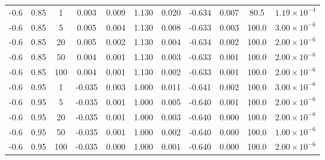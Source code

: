 \documentclass[10pt,twoside]{article}
\numberwithin{equation}{section}
\begin{document}
\begin{table}[htbp]
\begin{center}
\begin{tabular}{|c|c|c|cc|cc|cc|c|c|}
-0.6 & 0.85 & 1 & 0.003 & 0.009 & 1.130 & 0.020 & -0.634 & 0.007 & 80.5 & $1.19\times10^{-4}$ \\

-0.6 & 0.85 & 5 & 0.005 & 0.004 & 1.130 & 0.008 & -0.633 & 0.003 & 100.0 & $3.00\times10^{-6}$ \\

-0.6 & 0.85 & 20 & 0.005 & 0.002 & 1.130 & 0.004 & -0.634 & 0.002 & 100.0 & $2.00\times10^{-6}$ \\

-0.6 & 0.85 & 50 & 0.004 & 0.001 & 1.130 & 0.003 & -0.633 & 0.001 & 100.0 & $2.00\times10^{-6}$ \\

-0.6 & 0.85 & 100 & 0.004 & 0.001 & 1.130 & 0.002 & -0.633 & 0.001 & 100.0 & $2.00\times10^{-6}$ \\ \hline

-0.6 & 0.95 & 1 & -0.035 & 0.003 & 1.000 & 0.011 & -0.641 & 0.002 & 100.0 & $3.00\times10^{-6}$ \\

-0.6 & 0.95 & 5 & -0.035 & 0.001 & 1.000 & 0.005 & -0.640 & 0.001 & 100.0 & $2.00\times10^{-6}$ \\

-0.6 & 0.95 & 20 & -0.035 & 0.001 & 1.000 & 0.003 & -0.640 & 0.000 & 100.0 & $2.00\times10^{-6}$ \\

-0.6 & 0.95 & 50 & -0.035 & 0.001 & 1.000 & 0.002 & -0.640 & 0.000 & 100.0 & $1.00\times10^{-6}$ \\

-0.6 & 0.95 & 100 & -0.035 & 0.000 & 1.000 & 0.001 & -0.640 & 0.000 & 100.0 & $2.00\times10^{-6}$ \\ \hline

\end{tabular}

\end{center}

\end{table}
\end{document}
